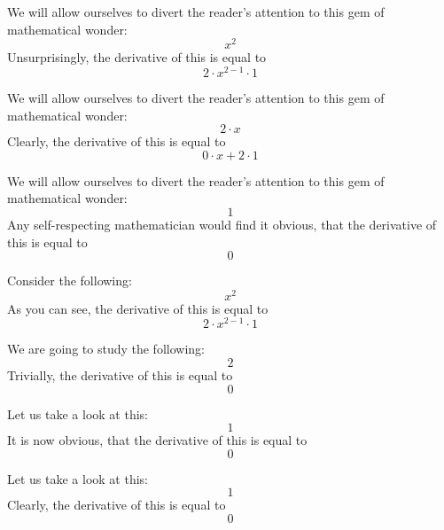 \documentclass{article}
\begin{document}
We will allow ourselves to divert the reader's attention to this gem of mathematical wonder:
\begin{equation}
x ^{2 } 
\end{equation}
Unsurprisingly, the derivative of this is equal to
\begin{equation}
2 \cdot x ^{2 - 1 } \cdot 1 
\end{equation}

We will allow ourselves to divert the reader's attention to this gem of mathematical wonder:
\begin{equation}
2 \cdot x 
\end{equation}
Clearly, the derivative of this is equal to
\begin{equation}
0 \cdot x + 2 \cdot 1 
\end{equation}

We will allow ourselves to divert the reader's attention to this gem of mathematical wonder:
\begin{equation}
1 
\end{equation}
Any self-respecting mathematician would find it obvious, that the derivative of this is equal to
\begin{equation}
0 
\end{equation}

Consider the following:
\begin{equation}
x ^{2 } 
\end{equation}
As you can see, the derivative of this is equal to
\begin{equation}
2 \cdot x ^{2 - 1 } \cdot 1 
\end{equation}

We are going to study the following:
\begin{equation}
2 
\end{equation}
Trivially, the derivative of this is equal to
\begin{equation}
0 
\end{equation}

Let us take a look at this:
\begin{equation}
1 
\end{equation}
It is now obvious, that the derivative of this is equal to
\begin{equation}
0 
\end{equation}

Let us take a look at this:
\begin{equation}
1 
\end{equation}
Clearly, the derivative of this is equal to
\begin{equation}
0 
\end{equation}
\end{document}
